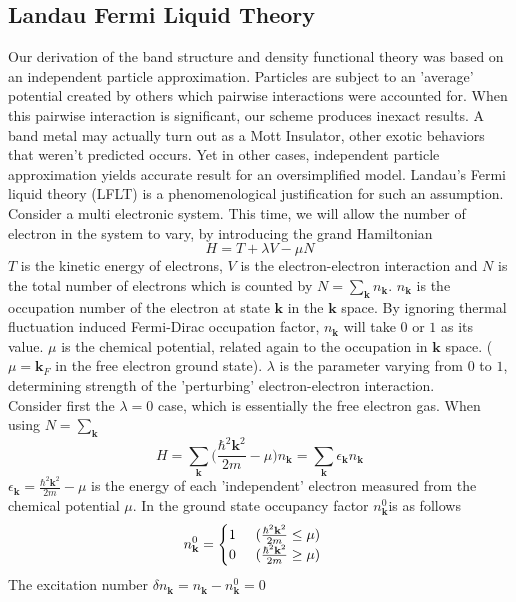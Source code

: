 \documentclass{article}
\begin{document}
\subsection*{Landau Fermi Liquid Theory}
Our derivation of the band structure and density functional theory was based on an independent particle approximation. Particles are subject to an 'average' potential created by others which pairwise interactions were accounted for. When this pairwise interaction is significant, our scheme produces inexact results. A band metal may actually turn out as a Mott Insulator, other exotic behaviors that weren't predicted occurs. Yet in other cases, independent particle approximation yields accurate result for an oversimplified model. Landau's Fermi liquid theory (LFLT) is a phenomenological justification for such an assumption.\\
Consider a multi electronic system. This time, we will allow the number of electron in the system to vary, by introducing the grand Hamiltonian
$$H=T+\lambda V-\mu N$$
$T$ is the kinetic energy of electrons, $V$ is the electron-electron interaction and $N$ is the total number of electrons which is counted by $N=\sum_{\mathbf{k}}n_{\mathbf{k}}$. $n_{\mathbf{k}}$ is the occupation number of the electron at state $\mathbf{k}$ in the $\mathbf{k}$ space. By ignoring thermal fluctuation induced Fermi-Dirac occupation factor, $n_{\mathbf{k}}$ will take $0$ or $1$ as its value. $\mu$ is the chemical potential, related again to the occupation in $\mathbf{k}$ space. ($\mu=\mathbf{k}_F$ in the free electron ground state). $\lambda$ is the parameter varying from $0$ to $1$, determining strength of the 'perturbing' electron-electron interaction.\\
Consider first the $\lambda=0$ case, which is essentially the free electron gas. When using $N=\sum_{\mathbf{k}}$
$$H=\sum_{\mathbf{k}}\Biggl(\frac{\hbar^2\mathbf{k}^2}{2m}-\mu\Biggr)n_{\mathbf{k}}=\sum_{\mathbf{k}}\epsilon_{\mathbf{k}}n_{\mathbf{k}}$$
$\epsilon_{\mathbf{k}}=\frac{\hbar^2\mathbf{k}^2}{2m}-\mu$ is the energy of each 'independent' electron measured from the chemical potential $\mu$. In the ground state occupancy factor $n_{\mathbf{k}}^{0}$is as follows
$$n_{\mathbf{k}}^{0}=
	\begin{cases}
		1\hspace{5mm}(\frac{\hbar^2\mathbf{k}^2}{2m}\leq\mu) \\
		0\hspace{5mm}(\frac{\hbar^2\mathbf{k}^2}{2m}\geq\mu)
	\end{cases}$$
The excitation number $\delta n_{\mathbf{k}}=n_{\mathbf{k}}-n_{\mathbf{k}}^{0}=0$\\
\end{document}

